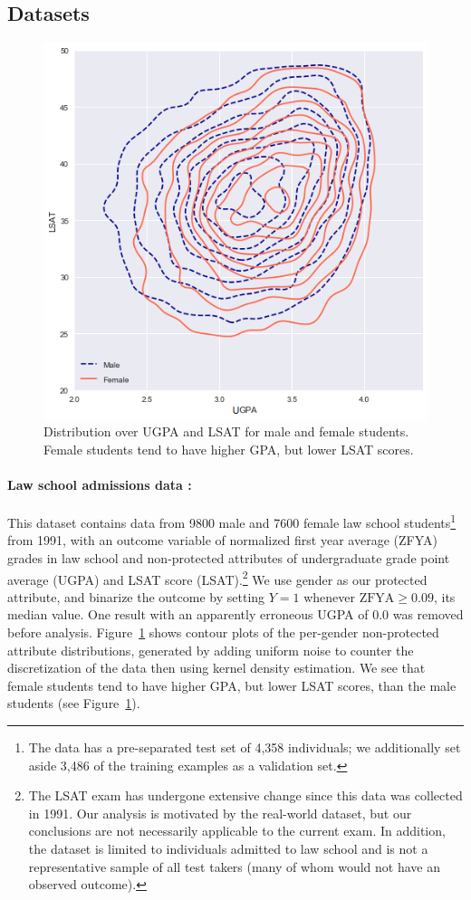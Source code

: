     \subsection{Datasets}
        \begin{figure}[ht]
            \centering
            \includegraphics[width=.5\textwidth]{fig_monofair/law_school_contour}
            \caption{Distribution over UGPA and LSAT for male and female students. Female students tend to have higher GPA, but lower LSAT scores.}
            \label{fig:law_contour}
        \end{figure}
        
        \paragraph{Law school admissions data \citep{wightman1998lsac}:} 
            This dataset  contains data from 9800 male and 7600 female law school students\footnote{The data has a pre-separated test set of 4,358 individuals; we additionally set aside 3,486 of the training examples as a validation set.} from 1991, with an outcome variable of normalized first year average (ZFYA) grades in law school and non-protected attributes of undergraduate grade point average (UGPA) and LSAT score (LSAT).\footnote{The LSAT exam has undergone extensive change since this data was collected in 1991.  Our analysis is motivated by the real-world dataset, but our conclusions are not necessarily applicable to the current exam. In addition, the dataset is limited to individuals admitted to law school and is not a representative sample of all test takers (many of whom would not have an observed outcome).}  We use gender as our protected attribute, and binarize the outcome by setting $Y=1$ whenever $\mbox{ZFYA} \ge 0.09$, its median value. One result with an apparently erroneous UGPA of 0.0 was removed before analysis. Figure~\ref{fig:law_contour} shows contour plots of the per-gender non-protected attribute distributions, generated by adding uniform noise to counter the discretization of the data then using kernel density estimation. We see that female students tend to have higher GPA, but lower LSAT scores, than the male students (see Figure~\ref{fig:law_contour}).
        
